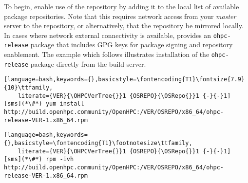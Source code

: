 To begin, enable use of the \OHPC{} repository by adding it to the local list
of available package repositories. Note that this requires network access from
your {\em master} server to the \OHPC{} repository, or alternatively, that
the \OHPC{} repository be mirrored locally.  In cases where network external
connectivity is available, \OHPC{} provides an \texttt{ohpc-release} package
that includes GPG keys for package signing and repository enablement.  The
example which follows illustrates installation of the \texttt{ohpc-release}
package directly from the \OHPC{} build server.

\begin{lstlisting}[language=bash,keywords={},basicstyle=\fontencoding{T1}\fontsize{7.9}{10}\ttfamily,
	literate={VER}{\OHPCVerTree{}}1 {OSREPO}{\OSRepo{}}1 {-}{-}1]
[sms](*\#*) yum install http://build.openhpc.community/OpenHPC:/VER/OSREPO/x86_64/ohpc-release-VER-1.x86_64.rpm
\end{lstlisting}
\else
\begin{lstlisting}[language=bash,keywords={},basicstyle=\fontencoding{T1}\footnotesize\ttfamily,
	literate={VER}{\OHPCVerTree{}}1 {OSREPO}{\OSRepo{}}1 {-}{-}1]
[sms](*\#*) rpm -ivh http://build.openhpc.community/OpenHPC:/VER/OSREPO/x86_64/ohpc-release-VER-1.x86_64.rpm
\end{lstlisting}
\fi







